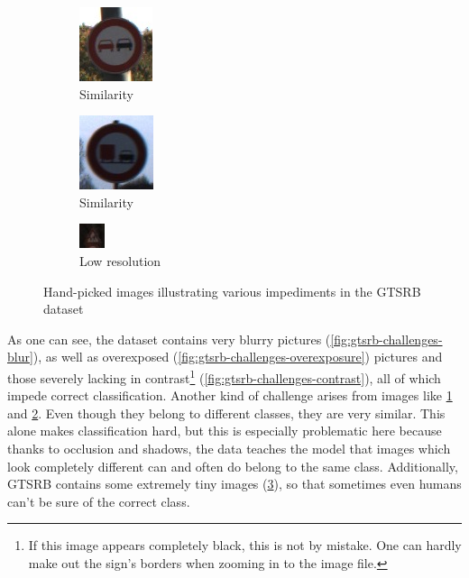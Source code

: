 \documentclass[11pt, a4paper]{article}
\begin{document}
\begin{figure}[h!tb]
    \begin{subfigure}[b]{0.30\textwidth}
    		\centering
        \includegraphics{gtsrb/problems/class09_00004_00029.jpg}
        \caption{Similarity}
        \label{fig:gtsrb-challenges-similar-a}
    \end{subfigure}
    \begin{subfigure}[b]{0.30\textwidth}
    		\centering
        \includegraphics{gtsrb/problems/class10_00025_00029.jpg}
        \caption{Similarity}
        \label{fig:gtsrb-challenges-similar-b}
    \end{subfigure}
    \begin{subfigure}[b]{0.30\textwidth}
    		\centering
        \includegraphics{gtsrb/problems/class28_00012_00003.jpg}
        \caption{Low resolution}
        \label{fig:gtsrb-challenges-resolution}
    \end{subfigure}
    \caption{Hand-picked images illustrating various impediments in the GTSRB dataset}
    \label{fig:gtsrb-challenges}
\end{figure}

As one can see, the dataset contains very blurry pictures (\ref{fig:gtsrb-challenges-blur}), as well as overexposed (\ref{fig:gtsrb-challenges-overexposure}) pictures and those severely lacking in contrast\footnote{If this image appears completely black, this is not by mistake. One can hardly make out the sign's borders when zooming in to the image file.} (\ref{fig:gtsrb-challenges-contrast}), all of which impede correct classification. Another kind of challenge arises from images like \ref{fig:gtsrb-challenges-similar-a} and \ref{fig:gtsrb-challenges-similar-b}. Even though they belong to different classes, they are very similar. This alone makes classification hard, but this is especially problematic here because thanks to occlusion and shadows, the data teaches the model that images which look completely different can and often do belong to the same class. Additionally, GTSRB contains some extremely tiny images (\ref{fig:gtsrb-challenges-resolution}), so that sometimes even humans can't be sure of the correct class.
\end{document}
